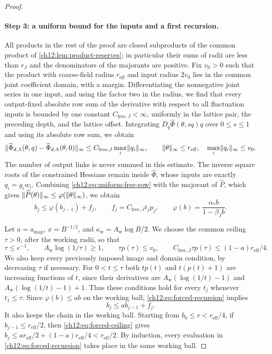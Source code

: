 \begin{proof}
\paragraph{Step 3: a uniform bound for the inputs and a first recursion.}
All products in the rest of the proof are closed subproducts of the common product of \cref{ch12:lem:product-reserves}; in particular their sums of radii are less than $r_J$ and the denominators of the majorants are positive. Fix $v_0>0$ such that the product with coarse-field radius $r_{\mathrm{eff}}$ and input radius $2v_0$ lies in the common joint coefficient domain, with a margin. Differentiating the nonnegative joint series in one input, and using the factor two in the radius, we find that every output-fixed absolute row sum of the derivative with respect to all fluctuation inputs is bounded by one constant $C_{\mathrm{free},J}<\infty$, uniformly in the lattice pair, the preceding depth, and the lattice offset. Integrating $D_q\widehat\Phi(\theta,sq)q$ over $0\le s\le1$ and using its absolute row sum, we obtain
\begin{equation}
 \lVert \widehat\Phi_{d,\Lambda}(\theta,q)-\widehat\Phi_{d,\Lambda}(\theta,0)\rVert_\infty\le C_{\mathrm{free},J}\max_i\lVert q_i\rVert_\infty,
 \qquad \lVert \theta\rVert_\infty\le r_{\mathrm{eff}},\quad \max_i\lVert q_i\rVert_\infty\le v_0 . \label{ch12:eq:uniform-free-row}
\end{equation}
The number of output links is never summed in this estimate. The inverse square roots of the constrained Hessians remain inside $\widehat\Phi$, whose inputs are exactly $q_i=g_iw_i$. Combining \eqref{ch12:eq:uniform-free-row} with the majorant of $\widehat P$, which gives $\lVert \widehat P(\theta)\rVert_\infty\le\varphi(\lVert \theta\rVert_\infty)$, we obtain
\begin{equation}
 b_j\le\varphi(b_{j-1})+f_j,\qquad f_j=C_{\mathrm{free},J}t_jp_j,\qquad \varphi(b)=\frac{\alpha_*b}{1-\beta_Jb}. \label{ch12:eq:forced-recursion}
\end{equation}

Let $a=a_{\mathrm{map}}$, $x=B^{-1/2}$, and $\kappa_{\mathrm w}=A_{\mathrm w}\log B/2$. We choose the common ceiling $\tau>0$, after the working radii, so that
\begin{equation}
 \tau\le e^{-1},\qquad A_{\mathrm w}\log(1/\tau)\ge1,\qquad \tau p(\tau)\le v_0,\qquad C_{\mathrm{free},J}\tau p(\tau)\le(1-a)r_{\mathrm{eff}}/4 . \label{ch12:eq:forced-ceiling}
\end{equation}
We also keep every previously imposed image and domain condition, by decreasing $\tau$ if necessary. For $0<t\le\tau$ both $tp(t)$ and $t(p(t)+1)$ are increasing functions of $t$, since their derivatives are $A_{\mathrm w}(\log(1/t)-1)$ and $A_{\mathrm w}(\log(1/t)-1)+1$. Thus these conditions hold for every $t_j$ whenever $t_1\le\tau$. Since $\varphi(b)\le ab$ on the working ball, \eqref{ch12:eq:forced-recursion} implies
\[
 b_j\le ab_{j-1}+f_j .
\]
It also keeps the chain in the working ball. Starting from $b_0\le r<r_{\mathrm{eff}}/4$, if $b_{j-1}\le r_{\mathrm{eff}}/2$, then \eqref{ch12:eq:forced-ceiling} gives $b_j\le ar_{\mathrm{eff}}/2+(1-a)r_{\mathrm{eff}}/4<r_{\mathrm{eff}}/2$. By induction, every evaluation in \eqref{ch12:eq:forced-recursion} takes place in the same working ball.


\end{proof}
